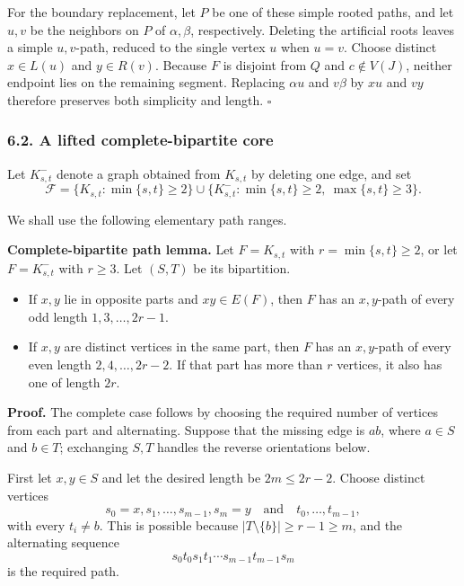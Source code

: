\documentclass[
  11pt]{article}
\providecommand{\tightlist}{%
  \setlength{\itemsep}{0pt}\setlength{\parskip}{0pt}}
\let\papersubsection\subsubsection
\renewcommand{\subsubsection}{\Needspace{7\baselineskip}\papersubsection}
\begin{document}
For the boundary replacement, let \(P\) be one of these simple rooted
paths, and let \(u,v\) be the neighbors on \(P\) of \(\alpha,\beta\),
respectively. Deleting the artificial roots leaves a simple
\(u,v\)-path, reduced to the single vertex \(u\) when \(u=v\). Choose
distinct \(x\in L(u)\) and \(y\in R(v)\). Because \(F\) is disjoint from
\(Q\) and \(c\notin V(J)\), neither endpoint lies on the remaining
segment. Replacing \(\alpha u\) and \(v\beta\) by \(xu\) and \(vy\)
therefore preserves both simplicity and length. \(\square\)

\subsubsection{6.2. A lifted complete-bipartite
core}\label{a-lifted-complete-bipartite-core}

Let \(K_{s,t}^-\) denote a graph obtained from \(K_{s,t}\) by deleting
one edge, and set \[
 \mathcal F=
 \{K_{s,t}:\min\{s,t\}\ge2\}
 \cup
 \{K_{s,t}^-:\min\{s,t\}\ge2,\ \max\{s,t\}\ge3\}.
\]


We shall use the following elementary path ranges.

\textbf{Complete-bipartite path lemma.} Let \(F=K_{s,t}\) with
\(r=\min\{s,t\}\ge2\), or let \(F=K_{s,t}^-\) with \(r\ge3\). Let
\((S,T)\) be its bipartition.

\begin{itemize}
\tightlist
\item
  If \(x,y\) lie in opposite parts and \(xy\in E(F)\), then \(F\) has an
  \(x,y\)-path of every odd length \(1,3,\ldots,2r-1\).
\item
  If \(x,y\) are distinct vertices in the same part, then \(F\) has an
  \(x,y\)-path of every even length \(2,4,\ldots,2r-2\). If that part
  has more than \(r\) vertices, it also has one of length \(2r\).
\end{itemize}

\textbf{Proof.} The complete case follows by choosing the required
number of vertices from each part and alternating. Suppose that the
missing edge is \(ab\), where \(a\in S\) and \(b\in T\); exchanging
\(S,T\) handles the reverse orientations below.

First let \(x,y\in S\) and let the desired length be \(2m\le2r-2\).
Choose distinct vertices \[
 s_0=x,s_1,\ldots,s_{m-1},s_m=y
 \quad\text{and}\quad
 t_0,\ldots,t_{m-1},
\] with every \(t_i\ne b\). This is possible because
\(|T\setminus\{b\}|\ge r-1\ge m\), and the alternating sequence \[
 s_0t_0s_1t_1\cdots s_{m-1}t_{m-1}s_m
\] is the required path.
\end{document}
